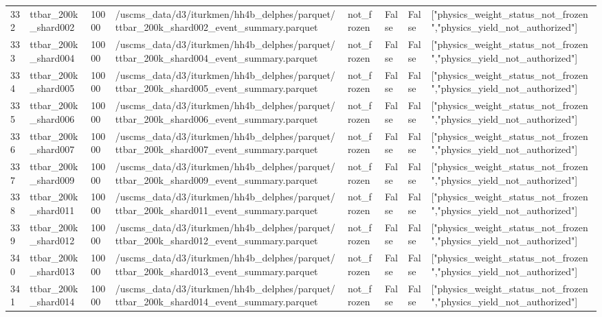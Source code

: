 \begin{table}[htbp]
\begin{tabular}{llllllll}
332 & ttbar\_200k\_shard002 & 10000 & /uscms\_data/d3/iturkmen/hh4b\_delphes/parquet/ttbar\_200k\_shard002\_event\_summary.parquet & not\_frozen & False & False & ["physics\_weight\_status\_not\_frozen","physics\_yield\_not\_authorized"] \\
333 & ttbar\_200k\_shard004 & 10000 & /uscms\_data/d3/iturkmen/hh4b\_delphes/parquet/ttbar\_200k\_shard004\_event\_summary.parquet & not\_frozen & False & False & ["physics\_weight\_status\_not\_frozen","physics\_yield\_not\_authorized"] \\
334 & ttbar\_200k\_shard005 & 10000 & /uscms\_data/d3/iturkmen/hh4b\_delphes/parquet/ttbar\_200k\_shard005\_event\_summary.parquet & not\_frozen & False & False & ["physics\_weight\_status\_not\_frozen","physics\_yield\_not\_authorized"] \\
335 & ttbar\_200k\_shard006 & 10000 & /uscms\_data/d3/iturkmen/hh4b\_delphes/parquet/ttbar\_200k\_shard006\_event\_summary.parquet & not\_frozen & False & False & ["physics\_weight\_status\_not\_frozen","physics\_yield\_not\_authorized"] \\
336 & ttbar\_200k\_shard007 & 10000 & /uscms\_data/d3/iturkmen/hh4b\_delphes/parquet/ttbar\_200k\_shard007\_event\_summary.parquet & not\_frozen & False & False & ["physics\_weight\_status\_not\_frozen","physics\_yield\_not\_authorized"] \\
337 & ttbar\_200k\_shard009 & 10000 & /uscms\_data/d3/iturkmen/hh4b\_delphes/parquet/ttbar\_200k\_shard009\_event\_summary.parquet & not\_frozen & False & False & ["physics\_weight\_status\_not\_frozen","physics\_yield\_not\_authorized"] \\
338 & ttbar\_200k\_shard011 & 10000 & /uscms\_data/d3/iturkmen/hh4b\_delphes/parquet/ttbar\_200k\_shard011\_event\_summary.parquet & not\_frozen & False & False & ["physics\_weight\_status\_not\_frozen","physics\_yield\_not\_authorized"] \\
339 & ttbar\_200k\_shard012 & 10000 & /uscms\_data/d3/iturkmen/hh4b\_delphes/parquet/ttbar\_200k\_shard012\_event\_summary.parquet & not\_frozen & False & False & ["physics\_weight\_status\_not\_frozen","physics\_yield\_not\_authorized"] \\
340 & ttbar\_200k\_shard013 & 10000 & /uscms\_data/d3/iturkmen/hh4b\_delphes/parquet/ttbar\_200k\_shard013\_event\_summary.parquet & not\_frozen & False & False & ["physics\_weight\_status\_not\_frozen","physics\_yield\_not\_authorized"] \\
341 & ttbar\_200k\_shard014 & 10000 & /uscms\_data/d3/iturkmen/hh4b\_delphes/parquet/ttbar\_200k\_shard014\_event\_summary.parquet & not\_frozen & False & False & ["physics\_weight\_status\_not\_frozen","physics\_yield\_not\_authorized"] \\

\end{tabular}
\end{table}
